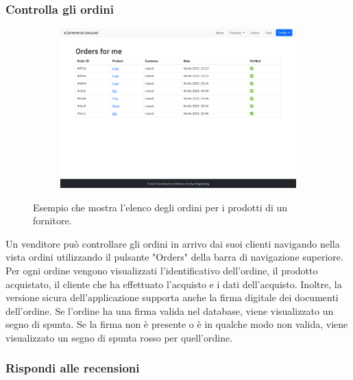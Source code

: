 \documentclass[conference,onecolumn,a4paper]{IEEEtran}
\begin{document}
{\subsubsection{Controlla gli ordini}

\begin{figure}[H]
    \centering
    \begin{subfigure}[b]{0.4\linewidth}
        \includegraphics[width=\linewidth]{resources/orders.png}
    \end{subfigure}
    \caption{Esempio che mostra l'elenco degli ordini per i prodotti di un fornitore.}
\end{figure}

Un venditore può controllare gli ordini in arrivo dai suoi clienti navigando nella vista ordini utilizzando il pulsante "Orders" della barra di navigazione superiore. Per ogni ordine vengono visualizzati l'identificativo dell'ordine, il prodotto acquistato, il cliente che ha effettuato l'acquisto e i dati dell'acquisto. Inoltre, la versione sicura dell'applicazione supporta anche la firma digitale dei documenti dell'ordine. Se l'ordine ha una firma valida nel database, viene visualizzato un segno di spunta. Se la firma non è presente o è in qualche modo non valida, viene visualizzato un segno di spunta rosso per quell'ordine.

\subsubsection{Rispondi alle recensioni}

}
\end{document}

